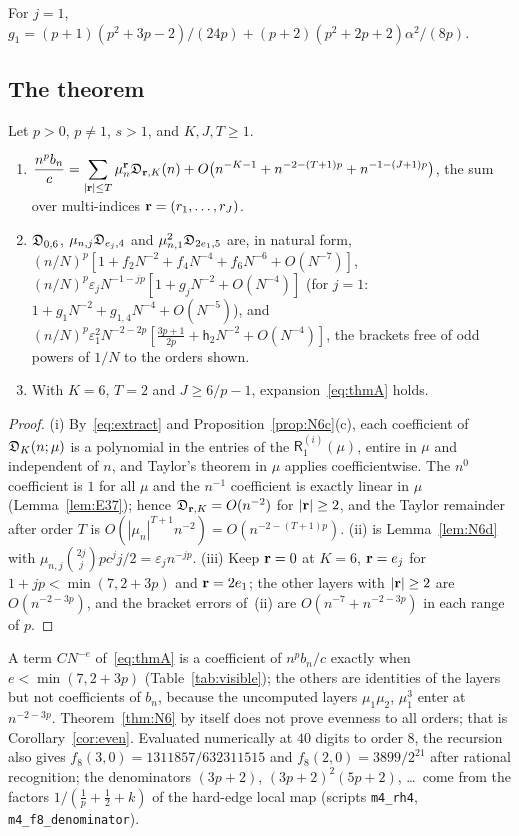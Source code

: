 For $j=1$, $g_1=(p+1)(p^2+3p-2)/(24p)+(p+2)(p^2+2p+2)\alpha^2/(8p)$.

\subsection{The theorem}\label{sec:N6}
\begin{theorem}\label{thm:N6}
Let $p>0$, $p\ne1$, $s>1$, and $K,J,T\ge1$.
\begin{enumerate}
\item[(i)] $\displaystyle\frac{n^pb_n}c=\sum_{|\mathbf r|\le T}\mu_n^{\mathbf r}\mathfrak D_{\mathbf r,K}(n)+O\bigl(n^{-K-1}+n^{-2-(T+1)p}+n^{-1-(J+1)p}\bigr)$,
the sum over multi-indices $\mathbf r=(r_1,\dots,r_J)$.
\item[(ii)] $\mathfrak D_{0,6}$, $\mu_{n,j}\mathfrak D_{e_j,4}$ and $\mu_{n,1}^2\mathfrak D_{2e_1,5}$ are, in natural form,
$(n/N)^p[1+f_2N^{-2}+f_4N^{-4}+f_6N^{-6}+O(N^{-7})]$, $(n/N)^p\varepsilon_jN^{-1-jp}[1+g_jN^{-2}+O(N^{-4})]$ (for $j=1$:
$1+g_1N^{-2}+g_{1,4}N^{-4}+O(N^{-5})$), and $(n/N)^p\varepsilon_1^2N^{-2-2p}[\frac{3p+1}{2p}+\mathsf h_2N^{-2}+O(N^{-4})]$, the brackets free of odd powers of $1/N$ to the
orders shown.
\item[(iii)] With $K=6$, $T=2$ and $J\ge6/p-1$, expansion~\eqref{eq:thmA} holds.
\end{enumerate}
\end{theorem}

\begin{proof}
(i) By~\eqref{eq:extract} and Proposition~\ref{prop:N6c}(c), each coefficient of $\mathfrak D_K(n;\mu)$ is a polynomial in the entries of the
$\mathsf R_1^{(i)}(\mu)$, entire in $\mu$ and independent of $n$, and Taylor's theorem in $\mu$ applies coefficientwise. The $n^0$
coefficient is $1$ for all $\mu$ and the $n^{-1}$ coefficient is exactly linear in $\mu$ (Lemma~\ref{lem:E37}); hence $\mathfrak D_{\mathbf r,K}=O(n^{-2})$
for $|\mathbf r|\ge2$, and the Taylor remainder after order $T$ is $O(|\mu_n|^{T+1}n^{-2})=O(n^{-2-(T+1)p})$. (ii) is Lemma~\ref{lem:N6d} with
$\mu_{n,j}\binom{2j}jpc^jj/2=\varepsilon_jn^{-jp}$. (iii) Keep $\mathbf r=0$ at $K=6$, $\mathbf r=e_j$ for $1+jp<\min(7,2+3p)$ and $\mathbf r=2e_1$; the other
layers with $|\mathbf r|\ge2$ are $O(n^{-2-3p})$, and the bracket errors of~(ii) are $O(n^{-7}+n^{-2-3p})$ in each range of $p$.
\end{proof}

A term $CN^{-e}$ of~\eqref{eq:thmA} is a coefficient of $n^pb_n/c$ exactly when $e<\min(7,2+3p)$ (Table~\ref{tab:visible}); the others are
identities of the layers but not coefficients of $b_n$, because the uncomputed layers $\mu_1\mu_2$, $\mu_1^3$ enter at $n^{-2-3p}$.
Theorem~\ref{thm:N6} by itself does not prove evenness to all orders; that is Corollary~\ref{cor:even}. Evaluated numerically at $40$ digits to
order $8$, the recursion also gives $f_8(3,0)=1311857/632311515$ and $f_8(2,0)=3899/2^{21}$ after rational recognition; the denominators
$(3p+2)$, $(3p+2)^2(5p+2)$, \dots\ come from the factors $1/(\frac1p+\frac12+k)$ of the hard-edge local map (scripts \texttt{m4\_rh4},
\texttt{m4\_f8\_denominator}).

